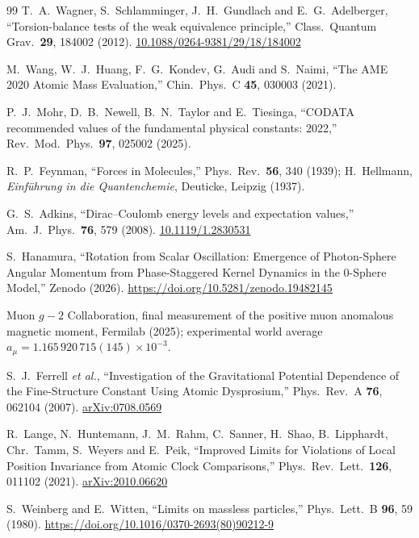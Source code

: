 \documentclass[%
 reprint, amsmath,amssymb, aps, prb, ]{revtex4-2}
\numberwithin{equation}{section}
\begin{document}
\begin{thebibliography}{99}
 T.~A.~Wagner, S.~Schlamminger, J.~H.~Gundlach and E.~G.~Adelberger, ``Torsion-balance tests of the weak equivalence principle,'' Class.\ Quantum Grav.\ \textbf{29}, 184002 (2012). \href{https://doi.org/10.1088/0264-9381/29/18/184002}{10.1088/0264-9381/29/18/184002}

 M.~Wang, W.~J.~Huang, F.~G.~Kondev, G.~Audi and S.~Naimi, ``The AME 2020 Atomic Mass Evaluation,'' Chin.\ Phys.\ C \textbf{45}, 030003 (2021).

 P.~J.~Mohr, D.~B.~Newell, B.~N.~Taylor and E.~Tiesinga, ``CODATA recommended values of the fundamental physical constants: 2022,'' Rev.\ Mod.\ Phys.\ \textbf{97}, 025002 (2025).

 R.~P.~Feynman, ``Forces in Molecules,'' Phys.\ Rev.\ \textbf{56}, 340 (1939); H.~Hellmann, \textit{Einf\"uhrung in die Quantenchemie}, Deuticke, Leipzig (1937).

 G.~S.~Adkins, ``Dirac--Coulomb energy levels and expectation values,'' Am.\ J.\ Phys.\ \textbf{76}, 579 (2008). \href{https://doi.org/10.1119/1.2830531}{10.1119/1.2830531}

 S.~Hanamura, ``Rotation from Scalar Oscillation: Emergence of Photon-Sphere Angular Momentum from Phase-Staggered Kernel Dynamics in the 0-Sphere Model,'' Zenodo (2026). \href{https://doi.org/10.5281/zenodo.19482145}{https://doi.org/10.5281/zenodo.19482145}

 Muon $g-2$ Collaboration, final measurement of the positive muon anomalous magnetic moment, Fermilab (2025); experimental world average $a_\mu = 1.165\,920\,715(145)\times10^{-3}$.

 S.~J.~Ferrell \textit{et al.}, ``Investigation of the Gravitational Potential Dependence of the Fine-Structure Constant Using Atomic Dysprosium,'' Phys.\ Rev.\ A \textbf{76}, 062104 (2007). \href{https://arxiv.org/abs/0708.0569}{arXiv:0708.0569}

 R.~Lange, N.~Huntemann, J.~M.~Rahm, C.~Sanner, H.~Shao, B.~Lipphardt, Chr.~Tamm, S.~Weyers and E.~Peik, ``Improved Limits for Violations of Local Position Invariance from Atomic Clock Comparisons,'' Phys.\ Rev.\ Lett.\ \textbf{126}, 011102 (2021). \href{https://arxiv.org/abs/2010.06620}{arXiv:2010.06620}

 S.~Weinberg and E.~Witten, ``Limits on massless particles,'' Phys.\ Lett.\ B \textbf{96}, 59 (1980). \href{https://doi.org/10.1016/0370-2693(80)90212-9}{https://doi.org/10.1016/0370-2693(80)90212-9}


\end{thebibliography}
\end{document}
